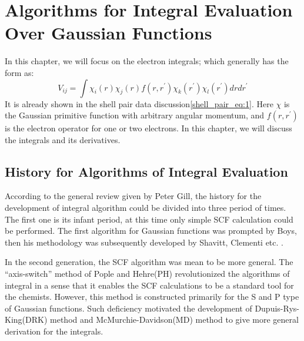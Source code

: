 %
% 
%
%
\chapter{Algorithms for Integral Evaluation Over Gaussian Functions}
%
%
%
%
%

In this chapter, we will focus on the electron integrals; which generally has the form as:
\begin{equation}
 V_{ij} = \int \chi_{i}(r)\chi_{j}(r)f(r,r^{'})
\chi_{k}(r^{'})\chi_{l}(r^{'}) dr dr^{'}
\end{equation}
It is already shown in the shell pair data discussion\ref{shell_pair_eq:1}. Here $\chi$ is 
the Gaussian primitive function with arbitrary angular momentum, and $f(r,r^{'})$ is the 
electron operator for one or two electrons. In this chapter, we will discuss the integrals
and its derivatives.

\section{History for Algorithms of Integral Evaluation}
%
%
%
%
According to the general review given by Peter Gill\cite{gill1994molecular}, the history for
the development of integral algorithm could be divided into three period of times. The first
one is its infant period, at this time only simple SCF calculation could be performed. The 
first algorithm for Gaussian functions was prompted by Boys\cite{SFBoys1950},
then his methodology was subsequently developed by
Shavitt\cite{1963_int_algorithm}, Clementi etc.
\cite{clementi1969study,clementi1972computation}.

In the second generation, the SCF algorithm was mean to be more general. The ``axis-switch''
method of Pople and Hehre(PH)\cite{PH} revolutionized the algorithms of integral in a sense 
that it enables the SCF calculations to be a standard tool for the chemists. However, this method
is constructed primarily for the S and P type of Gaussian functions. Such deficiency motivated
the development of Dupuis-Rys-King(DRK)\cite{DRK1976JCP, DRK1976JCOMP, DRK1983JCOMP} method 
and McMurchie-Davidson(MD)\cite{MD} method to give more general derivation for the integrals.

